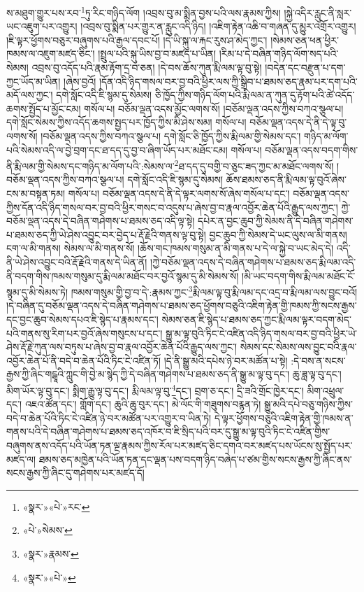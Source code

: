 ས་མཐུག་གྱུར་པས་རབ་\footnote{«སྣར་»«པེ་»རང་}ཏུ་རིང་གཉིད་ལོག །འབྲས་བུ་མ་སྨིན་བྱས་པའི་ལས་རྣམས་ཀྱིས། །སྐྱེ་འདིར་རླུང་ནི་སླར་ཡང་འཇུག་པར་འགྱུར། །འབྲས་བུ་སྨིན་པར་གྱུར་ན་རླུང་འདི་ཉིད། །འཇིག་རྟེན་འཆི་བ་གཞན་དུ་མྱུར་འགྲོར་འགྱུར། །ཇི་ལྟར་ཕྱོགས་བཅུར་བཞུགས་པའི་རྒྱལ་དབང་པོ། །དེ་ཡི་སྐུ་ལ་རྐང་རུས་ཤ་མེད་ཀྱང་། །སེམས་ཅན་ཕན་ཕྱིར་ཁམས་ལ་འཇུག་མཛད་ཅིང་། །སྤྲུལ་པའི་སྐུ་ཡིས་བྱ་བ་མཛད་པ་ཡིན། །རིམ་པ་དེ་བཞིན་གཉིད་ལོག་སད་པའི་སེམས། འབྲས་བུ་འདོད་པའི་རྣམ་རྟོག་དྲ་བ་ཅན། །དེ་བས་ཆོས་ཀུན་རྨི་ལམ་ལྟ་བུ་སྟེ། །བདེན་དང་བརྫུན་པ་དག་ཀྱང་ཡོད་མ་ཡིན། །ཞེས་བྱའོ། །དོན་འདི་ཉིད་གསལ་བར་བྱ་བའི་ཕྱིར་ལས་ཀྱི་སྒྲིབ་པ་ཐམས་ཅད་རྣམ་པར་དག་པའི་མདོ་ལས་ཀྱང་། དགེ་སློང་འདི་ཇི་སྙམ་དུ་སེམས། ཅི་ཁྱོད་ཀྱིས་གཉིད་ལོག་པའི་རྨི་ལམ་ན་ཀུན་དུ་རྟོག་པའི་ཚེ་འདོད་ཆགས་སྤྱོད་པ་མྱོང་ངམ། གསོལ་པ། བཅོམ་ལྡན་འདས་མྱོང་ལགས་སོ། །བཅོམ་ལྡན་འདས་ཀྱིས་བཀའ་སྩལ་པ། དགེ་སློང་སེམས་ཀྱིས་འདོད་ཆགས་སྤྱད་པར་ཁྱོད་ཀྱིས་མི་ཤེས་སམ། གསོལ་པ། བཅོམ་ལྡན་འདས་དེ་ནི་དེ་ལྟ་བུ་ལགས་སོ། །བཅོམ་ལྡན་འདས་ཀྱིས་བཀའ་སྩལ་པ། དགེ་སློང་ཅི་ཁྱོད་ཀྱིས་རྨི་ལམ་གྱི་སེམས་དང་། གཉིད་མ་ལོག་པའི་སེམས་འདི་ལ་བྱེ་བྲག་དང་ཐ་དད་དུ་བྱ་བ་ཞིག་ཡོད་པར་མཐོང་ངམ། གསོལ་པ། བཅོམ་ལྡན་འདས་བདག་གིས་ནི་རྨི་ལམ་གྱི་སེམས་དང་གཉིད་མ་ལོག་པའི་:སེམས་ལ་\footnote{«པེ་»སེམས་}ཐ་དད་དུ་བགྱི་བ་ཅུང་ཟད་ཀྱང་མ་མཐོང་ལགས་སོ། །བཅོམ་ལྡན་འདས་ཀྱིས་བཀའ་སྩལ་པ། དགེ་སློང་འདི་ཇི་སྙམ་དུ་སེམས། ཆོས་ཐམས་ཅད་ནི་རྨི་ལམ་ལྟ་བུའོ་ཞེས་ངས་མ་བསྟན་ཏམ། གསོལ་པ། བཅོམ་ལྡན་འདས་དེ་ནི་དེ་ལྟར་ལགས་སོ་ཞེས་གསོལ་པ་དང་། བཅོམ་ལྡན་འདས་ཀྱིས་དོན་འདི་ཉིད་གསལ་བར་བྱ་བའི་ཕྱིར་གསང་བ་འདུས་པ་ཞེས་བྱ་བ་རྣལ་འབྱོར་ཆེན་པོའི་རྒྱུད་ལས་ཀྱང་། ཀྱེ་བཅོམ་ལྡན་འདས་དེ་བཞིན་གཤེགས་པ་ཐམས་ཅད་འདི་ལྟ་སྟེ། དཔེར་ན་བྱང་ཆུབ་ཀྱི་སེམས་ནི་དེ་བཞིན་གཤེགས་པ་ཐམས་ཅད་ཀྱི་ཡེ་ཤེས་འབྱུང་བར་བྱེད་པ་རྡོ་རྗེའི་གནས་ལྟ་བུ་སྟེ། བྱང་ཆུབ་ཀྱི་སེམས་དེ་ཡང་ལུས་ལ་མི་གནས། ངག་ལ་མི་གནས། སེམས་ལ་མི་གནས་སོ། །ཆོས་གང་ཁམས་གསུམ་ན་མི་གནས་པ་དེ་ལ་སྐྱེ་བ་ཡང་མེད་དེ། འདི་ནི་ཡེ་ཤེས་འབྱུང་བའི་རྡོ་རྗེའི་གནས་དེ་ཡིན་ནོ། །ཀྱེ་བཅོམ་ལྡན་འདས་དེ་བཞིན་གཤེགས་པ་ཐམས་ཅད་རྨི་ལམ་འདི་ནི་བདག་གིས་ཁམས་གསུམ་དུ་རྨི་ལམ་མཐོང་བར་བྱའོ་སྙམ་དུ་མི་སེམས་སོ། །མི་ཡང་བདག་གིས་རྨི་ལམ་མཐོང་ངོ་སྙམ་དུ་མི་སེམས་ཏེ། ཁམས་གསུམ་གྱི་བྱ་བ་དེ་:རྣམས་ཀྱང་\footnote{«སྣར་»རྣམས་}རྨི་ལམ་ལྟ་བུ་རྨི་ལམ་དང་འདྲ་བ་རྨི་ལམ་ལས་བྱུང་བའོ། །དེ་བཞིན་དུ་བཅོམ་ལྡན་འདས་དེ་བཞིན་གཤེགས་པ་ཐམས་ཅད་ཕྱོགས་བཅུའི་འཇིག་རྟེན་གྱི་ཁམས་ཀྱི་སངས་རྒྱས་དང་བྱང་ཆུབ་སེམས་དཔའ་ཇི་སྙེད་པ་རྣམས་དང་། སེམས་ཅན་ཇི་སྙེད་པ་ཐམས་ཅད་ཀྱང་རྨི་ལམ་ལྟར་བདག་མེད་པའི་གནས་སུ་རིག་པར་བྱའོ་ཞེས་གསུངས་པ་དང་། སྒྱུ་མ་ལྟ་བུའི་ཏིང་ངེ་འཛིན་འདི་ཉིད་གསལ་བར་བྱ་བའི་ཕྱིར་ཡེ་ཤེས་རྡོ་རྗེ་ཀུན་ལས་བཏུས་པ་ཞེས་བྱ་བ་རྣལ་འབྱོར་ཆེན་པོའི་རྒྱུད་ལས་ཀྱང་། སེམས་དང་སེམས་ལས་བྱུང་བའི་རྣལ་འབྱོར་ཆེན་པོ་ནི་བདེ་བ་ཆེན་པོའི་ཏིང་ངེ་འཛིན་ཏོ། །དེ་ནི་སྒྱུ་མའི་དཔེས་ཉེ་བར་མཚོན་པ་སྟེ། :དེ་བས་ན་སངས་རྒྱས་ཀྱི་ཞིང་གངྒཱའི་ཀླུང་གི་བྱེ་མ་སྙེད་ཀྱི་དེ་བཞིན་གཤེགས་པ་ཐམས་ཅད་ནི་སྒྱུ་མ་ལྟ་བུ་དང་། ཆུ་ཟླ་ལྟ་བུ་དང་། མིག་ཡོར་ལྟ་བུ་དང་། སྨིག་རྒྱུ་ལྟ་བུ་དང་། རྨི་ལམ་ལྟ་བུ་\footnote{«སྣར་»«པེ་»}དང་། བྲག་ཅ་དང་། དྲི་ཟའི་གྲོང་ཁྱེར་དང་། མིག་འཕྲུལ་དང་། འཇའ་ཚོན་དང་། གློག་དང་། ཆུའི་ཆུ་བུར་དང་། མེ་ལོང་གི་གཟུགས་བརྙན་ཏེ། སྒྱུ་མའི་དཔེ་བཅུ་གཉིས་ཀྱིས་བདེ་བ་ཆེན་པོའི་ཏིང་ངེ་འཛིན་ཉེ་བར་མཚོན་པར་འགྱུར་བ་ཡིན་ཏེ། དེ་ལྟར་ཕྱོགས་བཅུའི་འཇིག་རྟེན་གྱི་ཁམས་ན་གནས་པའི་དེ་བཞིན་གཤེགས་པ་ཐམས་ཅད་འཁོར་བ་ཇི་སྲིད་པའི་བར་དུ་སྒྱུ་མ་ལྟ་བུའི་ཏིང་ངེ་འཛིན་གྱིས་བཞུགས་ནས་འདོད་པའི་ཡོན་ཏན་ལྔ་རྣམས་ཀྱིས་རོལ་པར་མཛད་ཅིང་དགའ་བར་མཛད་པས་ཡོངས་སུ་སྤྱོད་པར་མཛད་ལ། ཐམས་ཅད་མཁྱེན་པའི་ཡོན་ཏན་དང་ལྡན་པས་བདག་ཉིད་བཞེད་པ་ཙམ་གྱིས་སངས་རྒྱས་ཀྱི་ཞིང་ནས་སངས་རྒྱས་ཀྱི་ཞིང་དུ་གཤེགས་པར་མཛད་དོ། 